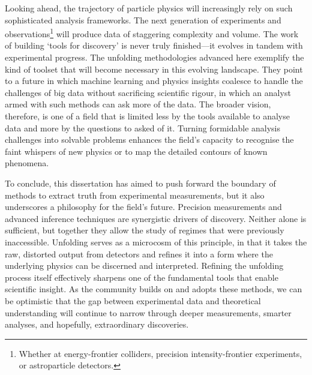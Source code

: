     Looking ahead, the trajectory of particle physics will increasingly rely on such sophisticated analysis frameworks.
    The next generation of experiments and observations\footnote{Whether at energy-frontier colliders, precision intensity-frontier experiments, or astroparticle detectors.} will produce data of staggering complexity and volume.
    The work of building `tools for discovery' is never truly finished---it evolves in tandem with experimental progress.
    The unfolding methodologies advanced here exemplify the kind of toolset that will become necessary in this evolving landscape.
    They point to a future in which machine learning and physics insights coalesce to handle the challenges of big data without sacrificing scientific rigour, in which an analyst armed with such methods can ask more of the data.
    The broader vision, therefore, is one of a field that is limited less by the tools available to analyse data and more by the questions to asked of it.
    Turning formidable analysis challenges into solvable problems enhances the field's capacity to recognise the faint whispers of new physics or to map the detailed contours of known phenomena.
                
    To conclude, this dissertation has aimed to push forward the boundary of methods to extract truth from experimental measurements, but it also underscores a philosophy for the field's future.
    Precision measurements and advanced inference techniques are synergistic drivers of discovery.
    Neither alone is sufficient, but together they allow the study of regimes that were previously inaccessible.
    Unfolding serves as a microcosm of this principle, in that it takes the raw, distorted output from detectors and refines it into a form where the underlying physics can be discerned and interpreted.
    Refining the unfolding process itself effectively sharpens one of the fundamental tools that enable scientific insight.
    As the community builds on and adopts these methods, we can be optimistic that the gap between experimental data and theoretical understanding will continue to narrow through deeper measurements, smarter analyses, and hopefully, extraordinary discoveries.